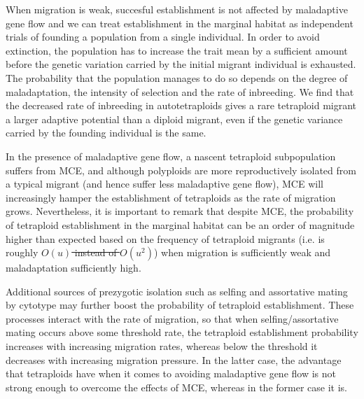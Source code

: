 \documentclass[12pt,a4paper]{article}
\providecommand{\DIFadd}[1]{{\protect\color{blue}\uwave{#1}}} %
\providecommand{\DIFdel}[1]{{\protect\color{red}\sout{#1}}}                      %
\providecommand{\DIFaddbegin}{} %
\providecommand{\DIFaddend}{} %
\providecommand{\DIFdelbegin}{} %
\providecommand{\DIFdelend}{} %
\begin{document}
When migration is weak, succesful establishment is not affected by
maladaptive gene flow and we can treat establishment in the marginal habitat as
independent trials of founding a population from a single individual.
In order to avoid extinction, the population has to increase the trait mean
by a sufficient amount before the genetic variation carried by the initial
migrant individual is exhausted.
The probability that the population manages to do so depends on the degree of
maladaptation, the intensity of selection and the rate of inbreeding.
We find that the decreased rate of inbreeding in autotetraploids gives a
rare tetraploid migrant a larger adaptive potential than a diploid migrant,
even if the genetic variance carried by the founding individual is the same.

In the presence of maladaptive gene flow, a nascent tetraploid subpopulation
suffers from MCE, and although polyploids are more reproductively isolated from
a typical migrant (and hence suffer less maladaptive gene flow), MCE will
increasingly hamper the establishment of tetraploids as the rate of migration
grows.
Nevertheless, it is important to remark that despite MCE, the probability of
tetraploid establishment in the marginal habitat can be an order of magnitude
higher than expected based on the frequency of tetraploid migrants (i.e. is
roughly \DIFdelbegin \DIFdel{$O(u)$ instead of $O(u^2)$}\DIFdelend \DIFaddbegin \DIFadd{of order $u$ instead of $u^2$}\DIFaddend ) when migration is sufficiently weak and
maladaptation sufficiently high.

Additional sources of prezygotic isolation such as selfing and assortative
mating by cytotype may further boost the probability of tetraploid
establishment.
These processes interact with the rate of migration, so that when
selfing/assortative mating occurs above some threshold rate, the tetraploid
establishment probability increases with increasing migration rates, whereas
below the threshold it decreases with increasing migration pressure.
In the latter case, the advantage that tetraploids have when it comes to
avoiding maladaptive gene flow is not strong enough to overcome the effects of
MCE, whereas in the former case it is.
\end{document}
